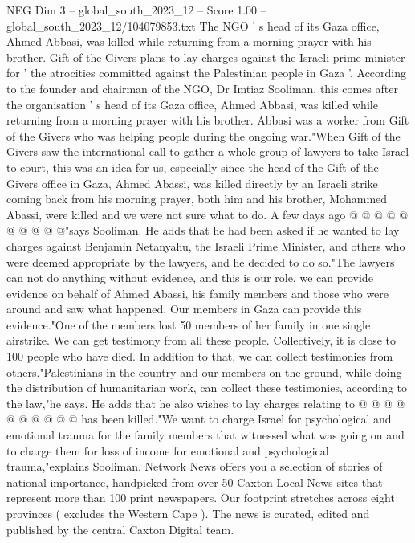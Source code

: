\begin{textsample}{NEG Dim 3 – global\_south\_2023\_12 – Score 1.00 – global\_south\_2023\_12/104079853.txt}  \label{ex:f3_neg_009}
The NGO ' s head of its Gaza office, Ahmed Abbasi, was killed while returning from a morning prayer with his brother.
Gift of the Givers plans to lay charges against the Israeli prime minister for ' the atrocities committed against the Palestinian people in Gaza '.
According to the founder and chairman of the NGO, Dr Imtiaz Sooliman, this comes after the organisation ' s head of its Gaza office, Ahmed Abbasi, was killed while returning from a morning prayer with his brother.
Abbasi was a worker from Gift of the Givers who was helping people during the ongoing war."When Gift of the Givers saw the international call to gather a whole group of lawyers to take Israel to court, this was an idea for us, especially since the head of the Gift of the Givers office in Gaza, Ahmed Abassi, was killed directly by an Israeli strike coming back from his morning prayer, both him and his brother, Mohammed Abassi, were killed and we were not sure what to do.
A few days ago @ @ @ @ @ @ @ @ @ @"says Sooliman.
He adds that he had been asked if he wanted to lay charges against Benjamin Netanyahu, the Israeli Prime Minister, and others who were deemed appropriate by the lawyers, and he decided to do so."The lawyers can not do anything without evidence, and this is our role, we can provide evidence on behalf of Ahmed Abassi, his family members and those who were around and saw what happened.
Our members in Gaza can provide this evidence."One of the members lost 50 members of her family in one single airstrike.
We can get testimony from all these people.
Collectively, it is close to 100 people who have died.
In addition to that, we can collect testimonies from others."Palestinians in the country and our members on the ground, while doing the distribution of humanitarian work, can collect these testimonies, according to the law,"he says.
He adds that he also wishes to lay charges relating to @ @ @ @ @ @ @ @ @ @ has been killed."We want to charge Israel for psychological and emotional trauma for the family members that witnessed what was going on and to charge them for loss of income for emotional and psychological trauma,"explains Sooliman.
Network News offers you a selection of stories of national importance, handpicked from over 50 Caxton Local News sites that represent more than 100 print newspapers.
Our footprint stretches across eight provinces ( excludes the Western Cape ).
The news is curated, edited and published by the central Caxton Digital team.

\end{textsample}
